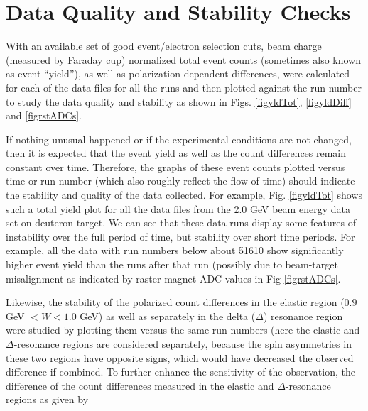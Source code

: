 

\section{Data Quality and Stability Checks}
With an available set of good  event/electron selection cuts, beam charge (measured by Faraday cup) normalized total event counts (sometimes also known as event ``yield''), as well as polarization dependent %
differences, were calculated for each of the data files for all the runs %
and then plotted against the run number to study the data quality and stability as shown in Figs. \ref{figyldTot}, \ref{figyldDiff} and \ref{figrstADCs}.

If nothing unusual happened or if the experimental conditions are not changed, %
then it is expected that the event yield as well as the count differences remain constant over time. Therefore, the graphs of these event counts plotted versus time or run number (which also roughly reflect the flow of time) should indicate the stability and quality of the data collected. For example, Fig. \ref{figyldTot} shows such a total yield plot for all the data files from the 2.0 GeV beam energy data set on deuteron target. We can see that these data runs display %
 some features of instability over the full period of time, but %
 stability over short time periods. For example, all the data with run numbers below about 51610 show significantly higher event yield than the runs after that run %
 (possibly due to  beam-target misalignment %
 as indicated by raster magnet ADC values in Fig \ref{figrstADCs}. 



Likewise, the stability of the polarized %
count differences in the elastic region ($0.9$ GeV $<W<1.0$ GeV) as well as separately in the delta ($\Delta$) resonance region were studied by plotting them versus the same run numbers (here the elastic and $\Delta$-resonance regions are %
considered separately, because the spin asymmetries in these two regions have opposite signs, which would 
have decreased the observed difference if combined.
To further enhance the sensitivity of the observation, the difference of the count differences measured in the elastic and $\Delta$-resonance regions as given by 

